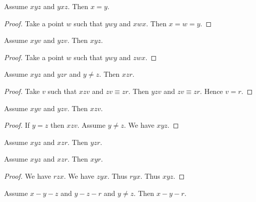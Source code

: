 \documentclass{article}
\newcommand{\Cong}[4]{#1 #2 \equiv #3 #4}
\newcommand{\Betw}[3]{#1 #2 #3}
\begin{document}
  \begin{forthel}
    \begin{lemma} %
      Assume $\Betw{x}{y}{z}$ and $\Betw{y}{x}{z}$.
      Then $x = y$.
    \end{lemma}
    \begin{proof}
      Take a point $w$ such that
      $\Betw{y}{w}{y}$ and $\Betw{x}{w}{x}$.
      Then $x = w = y$.
    \end{proof}

    \begin{lemma} %
      Assume $\Betw{x}{y}{v}$ and $\Betw{y}{z}{v}$.
      Then $\Betw{x}{y}{z}$.
    \end{lemma}
    \begin{proof}
      Take a point $w$ such that
      $\Betw{y}{w}{y}$ and $\Betw{z}{w}{x}$.
    \end{proof}

    \begin{lemma} %
      Assume $\Betw{x}{y}{z}$ and $\Betw{y}{z}{r}$ and $y \neq z$.
      Then $\Betw{x}{z}{r}$.
    \end{lemma}
    \begin{proof}
      Take $v$ such that $\Betw{x}{z}{v}$ and $\Cong{z}{v}{z}{r}$.
      Then $\Betw{y}{z}{v}$ and $\Cong{z}{v}{z}{r}$.
      Hence $v = r$.
    \end{proof}

    \begin{lemma} %
      Assume $\Betw{x}{y}{v}$ and $\Betw{y}{z}{v}$.
      Then $\Betw{x}{z}{v}$.
    \end{lemma}
    \begin{proof}
      If $y = z$ then $\Betw{x}{z}{v}$.
      Assume $y \neq z$.
      We have $\Betw{x}{y}{z}$.
    \end{proof}

    \begin{lemma} %
      Assume $\Betw{x}{y}{z}$ and $\Betw{x}{z}{r}$. Then $\Betw{y}{z}{r}$.
    \end{lemma}

    \begin{lemma} %
      Assume $\Betw{x}{y}{z}$ and $\Betw{x}{z}{r}$. Then $\Betw{x}{y}{r}$.
    \end{lemma}
    \begin{proof}
      We have $\Betw{r}{z}{x}$.
      We have $\Betw{z}{y}{x}$.
      Thus $\Betw{r}{y}{x}$. %
      Thus $\Betw{x}{y}{z}$.
    \end{proof}

    \begin{lemma} %
      Assume $x-y-z$ and $y-z-r$ and $y \neq z$. Then $x-y-r$.
    \end{lemma}
  \end{forthel}
\end{document}

